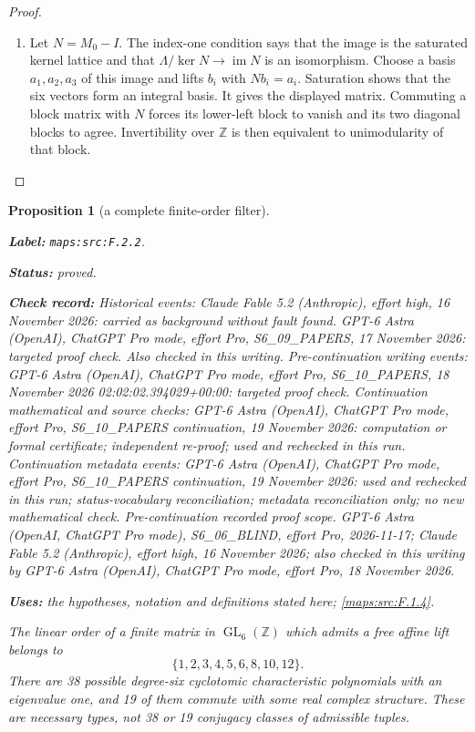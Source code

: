 \documentclass[11pt,a4paper]{article}
\newtheorem{proposition}[proposition]{Proposition}
\theoremstyle{definition}
\newcommand{\StatementRecord}[4]{\par\smallskip\begingroup\upshape\raggedright\noindent\textbf{Label:} \nolinkurl{#1}.\par\noindent\textbf{Status:} #2.\par\noindent\textbf{Check record:} #3.\par\noindent\textbf{Uses:} #4.\par\endgroup\smallskip}
\begin{document}
\begin{proof}
\begin{enumerate}[label=\arabic*.]
\item Let $N=M_0-I$.  The index-one condition says that the image
is the saturated kernel lattice and that
$\Lambda/\ker N\to\operatorname{im}N$ is an isomorphism.
Choose a basis $a_1,a_2,a_3$ of this image and lifts $b_i$ with
$Nb_i=a_i$.  Saturation shows that the six vectors form an
integral basis.  It gives the displayed matrix.  Commuting a
block matrix with $N$ forces its lower-left block to vanish
and its two diagonal blocks to agree.  Invertibility over
$\mathbb Z$ is then equivalent to unimodularity of that block.

\end{enumerate}
\end{proof}




\begin{proposition}[a complete finite-order filter]\label{maps:src:F.2.2}
\StatementRecord{maps:src:F.2.2}{proved}{Historical events: Claude Fable 5.2 (Anthropic), effort high, 16 November 2026: carried as background without fault found. GPT-6 Astra (OpenAI), ChatGPT Pro mode, effort Pro, S6\_09\_PAPERS, 17 November 2026: targeted proof check. Also checked in this writing. Pre-continuation writing events: GPT-6 Astra (OpenAI), ChatGPT Pro mode, effort Pro, S6\_10\_PAPERS, 18 November 2026 02:02:02.394029+00:00: targeted proof check. Continuation mathematical and source checks: GPT-6 Astra (OpenAI), ChatGPT Pro mode, effort Pro, S6\_10\_PAPERS continuation, 19 November 2026: computation or formal certificate; independent re-proof; used and rechecked in this run. Continuation metadata events: GPT-6 Astra (OpenAI), ChatGPT Pro mode, effort Pro, S6\_10\_PAPERS continuation, 19 November 2026: used and rechecked in this run; status-vocabulary reconciliation; metadata reconciliation only; no new mathematical check. \emph{Pre-continuation recorded proof scope.} GPT-6 Astra (OpenAI, ChatGPT Pro mode), S6\_06\_BLIND, effort Pro, 2026-11-17; Claude Fable 5.2 (Anthropic), effort high, 16 November 2026; also checked in this writing by GPT-6 Astra (OpenAI), ChatGPT Pro mode, effort Pro, 18 November 2026}{the hypotheses, notation and definitions stated here; \cref{maps:src:F.1.4}}


The linear order of a finite matrix in $\operatorname{GL}_6(\mathbb Z)$
which admits a free affine lift belongs to
\[
 \{1,2,3,4,5,6,8,10,12\}.
 \tag{F.3}\label{maps:eq:F.3}
\]
There are 38 possible degree-six cyclotomic characteristic
polynomials with an eigenvalue one, and 19 of them commute
with some real complex structure.  These are necessary types,
not 38 or 19 conjugacy classes of admissible tuples.

\end{proposition}
\end{document}
